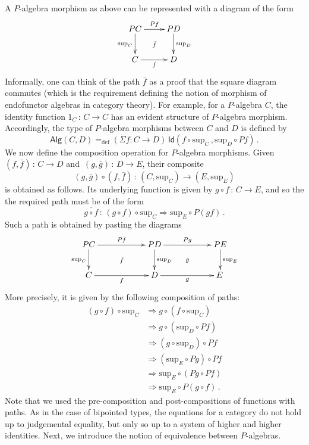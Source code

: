 \documentclass[10pt,a4paper,oneside,reqno]{amsart}
\theoremstyle{mythm}
\theoremstyle{mydef}
\theoremstyle{myrmk}
\newcommand{\defeq}{=_{\mathrm{def}}}
\newcommand{\co}{\,{:}\,}
\newcommand{\Id}{\mathsf{Id}}
\newcommand{\Palg}{\mathsf{Alg}}
\renewcommand{\sup}{\mathrm{sup}}
\begin{document}
A $P$-algebra morphism as above can be represented with a diagram of the form
\[
\xymatrix{
 PC \ar[d]_{\sup_C} \ar[r]^{Pf}  \ar@{}[dr]|{\bar{f}} &  PD \ar[d]^{\sup_D}\\
C \ar[r]_{f}   & D}
\] 
Informally, one can think of the path $\bar{f}$ as a proof that the square diagram commutes (which is the 
requirement defining the notion of morphism of endofunctor algebras in category theory). For example, for a $P$-algebra $C$, 
the identity function $1_C \co C \to C$ has an evident structure of $P$-algebra morphism. Accordingly, the type of $P$-algebra 
morphisms between $C$ and $D$ is defined by
\[
\Palg(C,D)
 \defeq  
(\Sigma f:  C \rightarrow D) \, \Id(f\circ \sup_C \, ,  \sup_D \circ P f )  \, .
\]
We now define the composition operation for $P$-algebra morphisms. Given $(f, \bar{f}) \co C \to D$ and~$(g, \bar{g}) \co D \to E$,
their composite 
\[
(g, \bar{g}) \circ (f, \bar{f}) \co (C, \sup_C) \to (E, \sup_E)
\] 
is obtained as follows. Its underlying function is given by $g\circ f\co C \to E$, and so the 
the required path must be of the form
\[
 \overline{ g \circ f} \co (g\circ f) \circ \sup_C \Rightarrow \sup_E \circ P(gf)\, .
\]
Such a path is obtained by pasting the diagrams 
\[
\xymatrix@C=2cm{
 PC \ar[d]_{\sup_C} \ar[r]^{Pf}  \ar@{}[dr]|{\bar{f}} &  PD \ar[d]^{\sup_D}  \ar[r]^{Pg}  \ar@{}[dr]|{\bar{g}} &  PE \ar[d]^{\sup_E} \\
C \ar[r]_{f}   & D \ar[r]_{g}   & E \,  }
\]
More precisely, it is given by the following composition of paths:
\begin{align*}
(g\circ f) \circ \sup_C &  \Rightarrow g \circ (f \circ \sup_C) \\
 & \Rightarrow g \circ ( \sup_D \circ P f ) \\
 & \Rightarrow (g \circ \sup_D) \circ Pf \\
 & \Rightarrow (\sup_E \circ Pg) \circ Pf \\
 & \Rightarrow \sup_E \circ (Pg \circ Pf) \\
 & \Rightarrow \sup_E \circ P (g\circ f) \, .
 \end{align*}
Note that we used the pre-composition and post-compositions of functions with paths. As in the case of bipointed types, the equations for a category do not hold up to judgemental equality, but only so up to a system of higher and higher identities. Next, we introduce the notion of equivalence between $P$-algebras.

\medskip
\end{document}
